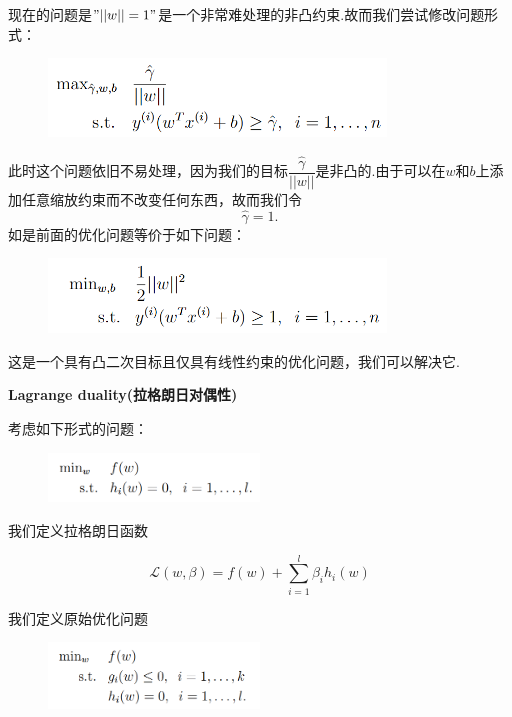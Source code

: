 \documentclass[12pt, a4paper, oneside]{ctexbook}
\begin{document}
现在的问题是$"||w||=1"$是一个非常难处理的非凸约束.故而我们尝试修改问题形式：

  \begin{figure}[h]
		\centering 
		\includegraphics[width=0.8\textwidth]{images38.png} 
	\end{figure}

此时这个问题依旧不易处理，因为我们的目标$\dfrac{\hat{\gamma}}{||w||}$是非凸的.由于可以在$ w $和$ b $上添加任意缩放约束而不改变任何东西，故而我们令\[\hat{\gamma}=1.\]如是前面的优化问题等价于如下问题：

  \begin{figure}[h]
		\centering 
		\includegraphics[width=0.8\textwidth]{images39.png} 
	\end{figure}

这是一个具有凸二次目标且仅具有线性约束的优化问题，我们可以解决它.

\hspace*{\fill}


\textbf{Lagrange duality(拉格朗日对偶性)}

考虑如下形式的问题：

  \begin{figure}[h]
		\centering 
		\includegraphics[width=0.5\textwidth]{images47.png} 
	\end{figure}

我们定义拉格朗日函数

\[\mathcal{L}(w,\beta)=f(w)+\sum_{i=1}^{l}\beta_i h_i(w)\]

我们定义原始优化问题

  \begin{figure}[h]
		\centering 
		\includegraphics[width=0.5\textwidth]{images48.png} 
	\end{figure}
\end{document}
